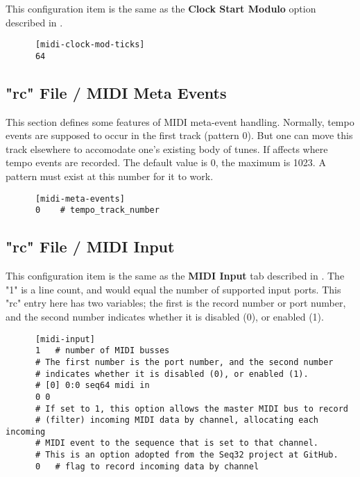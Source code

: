    This configuration item is the same as the
   \textbf{Clock Start Modulo} option described in
   .

   \begin{verbatim}
      [midi-clock-mod-ticks]
      64
   \end{verbatim}

\subsection{"rc" File / MIDI Meta Events}
\label{subsec:seq64_rc_file_midi_meta}

   This section defines some features of MIDI meta-event handling.  Normally,
   tempo events are supposed to occur in the first track (pattern 0).  But one
   can move this track elsewhere to accomodate one's existing body of tunes.
   If affects where tempo events are recorded.  The default value is 0, the
   maximum is 1023.  A pattern must exist at this number for it to work.

   \begin{verbatim}
      [midi-meta-events]
      0    # tempo_track_number
   \end{verbatim}

\subsection{"rc" File / MIDI Input}
\label{subsec:seq64_rc_file_midi_input}

   This configuration item is the same as the 
   \textbf{MIDI Input} tab described in
   .
   The "1" is a line count, and would equal the number of
   supported input ports.
   This "rc" entry here has two variables; the first is the record number or
   port number, and the second number indicates whether it is disabled (0),
   or enabled (1).

   \begin{verbatim}
      [midi-input]
      1   # number of MIDI busses
      # The first number is the port number, and the second number
      # indicates whether it is disabled (0), or enabled (1).
      # [0] 0:0 seq64 midi in
      0 0
      # If set to 1, this option allows the master MIDI bus to record
      # (filter) incoming MIDI data by channel, allocating each incoming
      # MIDI event to the sequence that is set to that channel.
      # This is an option adopted from the Seq32 project at GitHub.
      0   # flag to record incoming data by channel
   \end{verbatim}

